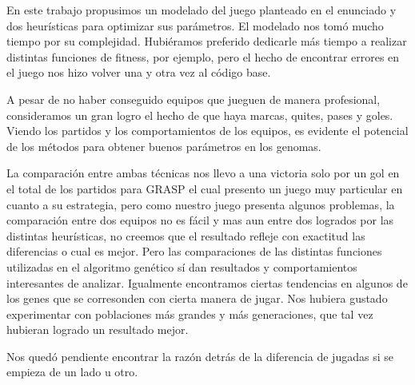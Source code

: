 En este trabajo propusimos un modelado del juego planteado en el enunciado y dos heurísticas para optimizar sus parámetros.
El modelado nos tomó mucho tiempo por su complejidad.
Hubiéramos preferido dedicarle más tiempo a realizar distintas funciones de fitness, por ejemplo, pero el hecho de encontrar
errores en el juego nos hizo volver una y otra vez al código base.

A pesar de no haber conseguido equipos que jueguen de manera profesional, consideramos un gran logro el hecho
 de que haya marcas, quites, pases y goles.
Viendo los partidos y los comportamientos de los equipos, es evidente el potencial de los métodos para obtener
 buenos parámetros en los genomas.

La comparación entre ambas técnicas nos llevo a una victoria solo por un gol en el total de los partidos para GRASP
el cual presento un juego muy particular en cuanto a su estrategia, pero como nuestro juego presenta algunos problemas,
 la comparación entre dos equipos no es fácil y mas aun entre dos logrados por las distintas heurísticas, no creemos que
el resultado refleje con exactitud las diferencias o cual es mejor. Pero las comparaciones de las distintas funciones utilizadas
 en el algoritmo genético sí dan resultados y comportamientos interesantes de analizar.
Igualmente encontramos ciertas tendencias en algunos de los genes que se corresonden con cierta manera de jugar.
Nos hubiera gustado experimentar con poblaciones más grandes y más generaciones, que tal vez hubieran logrado un resultado mejor.

Nos quedó pendiente encontrar la razón detrás de la diferencia de jugadas si se empieza de un lado u otro.

















